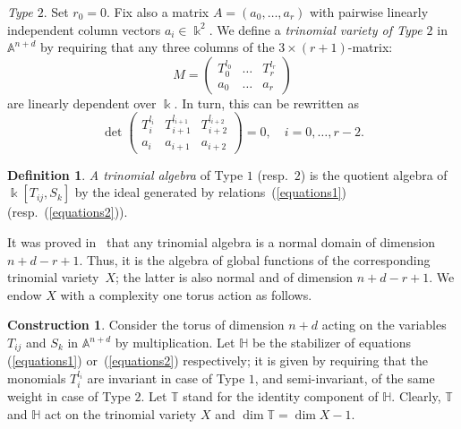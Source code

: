 \documentclass[a4paper,reqno,12pt]{amsart}
\theoremstyle{plain}
\theoremstyle{definition}
\newtheorem{definition}[theorem]{Definition}
\newtheorem{construction}[theorem]{Construction}
\theoremstyle{plain}
\theoremstyle{remark}
\newcommand{\A}{\mathbb A}
\newcommand{\TT}{\mathbb{T}}
\newcommand{\kk}{\Bbbk}
\newcommand{\HH}{\mathbb H}
\begin{document}
\textit{Type $2$}. Set $r_0=0$. Fix also a matrix $A = (a_0,\ldots,a_r)$ with pairwise linearly independent column vectors $a_i\in\kk^2$. We define a \emph{trinomial variety of Type $2$} %
in $\mathbb A^{n+d}$ %
by requiring that any three columns of the $3\times(r+1)$-matrix:
$$
M=\begin{pmatrix}
    T_0^{l_0} &\ldots &T_r^{l_r}\\
    a_0 &\ldots &a_r
\end{pmatrix}
$$
are linearly dependent over $\Bbbk$. In turn, this can be rewritten as
\begin{equation}\label{equations2}
    \det \begin{pmatrix}
    T_i^{l_i} & T_{i+1}^{l_{i+1}} & T_{i+2}^{l_{i+2}}\\
    a_i & a_{i+1} & a_{i+2}
\end{pmatrix}=0, \quad i=0,\ldots,r-2.
\tag{1.2}
\end{equation}
 \begin{definition}\label{DefTrinomial}
     \emph{A trinomial algebra} of Type $1$ (resp.~$2$) is the quotient algebra of $\kk[T_{ij}, S_k]$ by the ideal generated by relations~(\ref{equations1}) (resp.~(\ref{equations2})).
 \end{definition}

 It was proved in~\cite[Theorem~1.2]{HW} that any trinomial algebra is a normal domain of dimension $n+d-r+1$. Thus, it is the algebra of global functions of the corresponding trinomial variety~$X$; the latter is also normal and of dimension $n+d-r+1$. We endow $X$ with a complexity one torus action as follows.

\begin{construction}\label{ConstrAct}
Consider the torus of dimension $n+d$ acting on the variables $T_{ij}$ and $S_k$ in $\A^{n+d}$ by multiplication. Let $\HH$ be the stabilizer of equations (\ref{equations1}) or~(\ref{equations2}) respectively; it is given by requiring that the monomials $T_i^{l_i}$ are invariant in case of Type $1$, and semi-invariant, of the same weight in case of Type $2$. Let ${\TT}$ stand for the identity component of $\HH$. Clearly, ${\TT}$ and $\HH$ act on the trinomial variety $X$ and $\dim {\TT}=\dim X-1$.
\end{construction}
\end{document}

